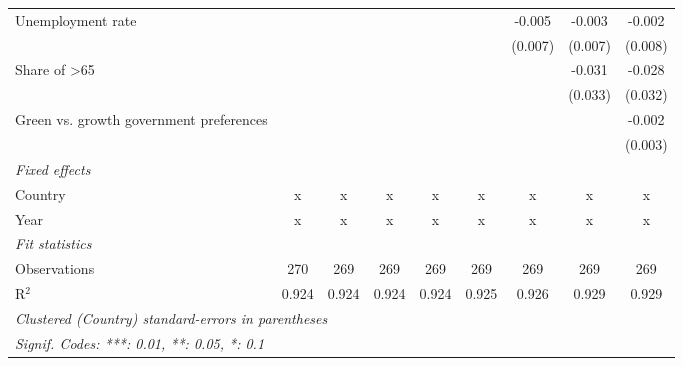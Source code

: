 \begin{table}[htbp]
\begin{tabular}{lcccccccc}
      Unemployment rate                                                  &         &         &         &         &         & -0.005  & -0.003  & -0.002\\   
                                                                         &         &         &         &         &         & (0.007) & (0.007) & (0.008)\\   
      Share of >65                                                       &         &         &         &         &         &         & -0.031  & -0.028\\   
                                                                         &         &         &         &         &         &         & (0.033) & (0.032)\\   
      Green vs. growth government preferences                            &         &         &         &         &         &         &         & -0.002\\   
                                                                         &         &         &         &         &         &         &         & (0.003)\\   
      \emph{Fixed effects}\\
      Country                                                            & x       & x       & x       & x       & x       & x       & x       & x\\  
      Year                                                               & x       & x       & x       & x       & x       & x       & x       & x\\  
      \midrule \emph{Fit statistics}\\
      Observations                                                       & 270     & 269     & 269     & 269     & 269     & 269     & 269     & 269\\  
      R$^2$                                                              & 0.924   & 0.924   & 0.924   & 0.924   & 0.925   & 0.926   & 0.929   & 0.929\\  
      \midrule
      \multicolumn{9}{l}{\emph{Clustered (Country) standard-errors in parentheses}}\\
      \multicolumn{9}{l}{\emph{Signif. Codes: ***: 0.01, **: 0.05, *: 0.1}}\\
   \end{tabular}
\end{table}


